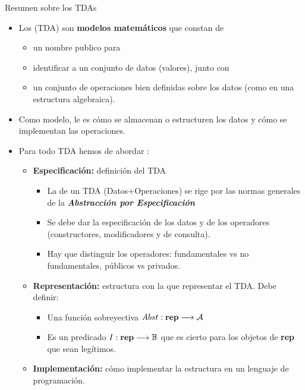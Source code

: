 \documentclass[10pt,envcountsect,spanish]{beamer}
\begin{document}
\begin{frame}{Resumen sobre los TDAs}
\begin{itemize}
\item  Los  (TDA) son \textbf{modelos matemáticos} que constan de

\begin{itemize}
\item un nombre publico para 
\item identificar a un conjunto de datos (valores), junto con
\item un conjunto de operaciones bien definidas sobre los datos (como en una estructura algebraica). 
\end{itemize}

\item Como modelo, le es  cómo se almacenan o estructuren los datos y cómo se implementan las operaciones.

\item Para todo TDA hemos de abordar : 

\begin{itemize}
\item \textbf{Especificación:} definición del TDA 

\begin{itemize}
\item La  de un TDA (Datos+Operaciones) se rige por las normas generales de la \textit{\bf Abstracción por Especificación}

\item Se debe dar la especificación de los datos y de los operadores (constructores, modificadores y de consulta).

\item Hay que distinguir los operadores: fundamentales vs no fundamentales, públicos vs privados.
\end{itemize}


\item \textbf{Representación:} estructura con la que representar el TDA. Debe definir:

\begin{itemize}
\item {} Una función sobreyectiva $Abst: \mbox{\textbf{rep}} \longrightarrow {\cal A}$ 

\item {} Es un predicado
$I: \mbox{\textbf{rep}} \longrightarrow \mathbb{B}$ que es cierto para los objetos de \textbf{rep} que sean legítimos.
\end{itemize}

\item \textbf{Implementación:} cómo implementar la estructura en un lenguaje de programación.

\end{itemize}

\end{itemize}
\end{frame}
\end{document}
